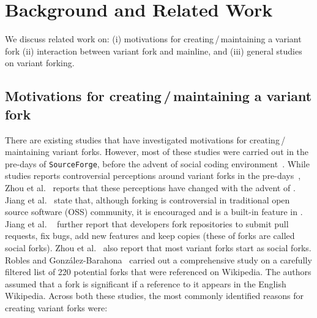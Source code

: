 \section{Background and Related Work}
\label{sec:background}
We discuss related work on: (i) motivations for creating\,/\,maintaining a variant fork (ii) interaction between variant fork and mainline, and (iii) general studies on variant forking.

\subsection{Motivations for creating\,/\,maintaining a variant fork}
\label{sec:motivations}
There are existing studies that have investigated motivations for creating\,/\,maintaining variant forks. However, most of these studies were carried out in the pre-\gh days of \texttt{SourceForge}, before the advent of social coding environment~\cite{Linus:2012Perspectives,Gregorio:2012,Viseur:2012Forks,Linus:2013CodeForking,Laurent:2008,Linus:2011ToFork}. While studies reports controversial perceptions around variant forks in the pre-\gh days~\cite{Chua:Forking:2017,Dixion:2009Forks,Ernst:2010,Linus:2011ToFork,Linus:2014Hackers,Raymond:Cathedral:2001}, Zhou et al.~\cite{Zhou:2020} reports that these perceptions have changed with the advent of \gh. Jiang et al.~\cite{Lo:2017} state that, although forking is controversial in traditional open source software (OSS) community, it is encouraged and is a built-in feature in \gh. Jiang et al. ~\cite{Lo:2017} further report that developers fork repositories to submit pull requests, fix bugs, add new features and keep copies (these of forks are called social forks). Zhou et al.~\cite{Zhou:2020} also report that most variant forks start as social forks. 
Robles and Gonz{\'a}lez-Barahona~\cite{Gregorio:2012} carried out a comprehensive study on a carefully filtered list of 220 potential forks that were referenced on Wikipedia. The authors assumed that a fork is significant if a reference to it appears in the English Wikipedia.
Across both these studies, the most commonly identified reasons for creating variant forks were:

